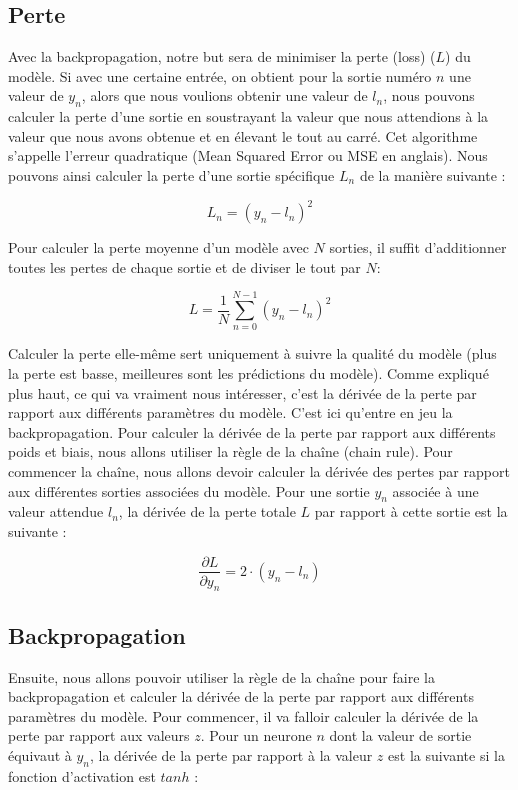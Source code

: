 \documentclass{article}
\begin{document}
\subsection{Perte}

Avec la backpropagation, notre but sera de minimiser la perte (loss) ($L$) du modèle. Si avec une certaine entrée, on obtient pour la sortie numéro $n$ une valeur de $y_n$, alors que nous voulions obtenir une valeur de $l_n$, nous pouvons calculer la perte d'une sortie en soustrayant la valeur que nous attendions à la valeur que nous avons obtenue et en élevant le tout au carré. Cet algorithme s'appelle l'erreur quadratique (Mean Squared Error ou MSE en anglais). Nous pouvons ainsi calculer la perte d'une sortie spécifique $L_n$ de la manière suivante :

\[
L_n = (y_n - l_n)^2
\]

Pour calculer la perte moyenne d'un modèle avec $N$ sorties, il suffit d'additionner toutes les pertes de chaque sortie et de diviser le tout par $N$:

\[
L = \frac{1}{N} \sum_{n=0}^{N-1} (y_n - l_n)^2
\]

\medskip

Calculer la perte elle-même sert uniquement à suivre la qualité du modèle (plus la perte est basse, meilleures sont les prédictions du modèle). Comme expliqué plus haut, ce qui va vraiment nous intéresser, c'est la dérivée de la perte par rapport aux différents paramètres du modèle. C'est ici qu'entre en jeu la backpropagation. Pour calculer la dérivée de la perte par rapport aux différents poids et biais, nous allons utiliser la règle de la chaîne (chain rule). Pour commencer la chaîne, nous allons devoir calculer la dérivée des pertes par rapport aux différentes sorties associées du modèle. Pour une sortie $y_n$ associée à une valeur attendue $l_n$, la dérivée de la perte totale $L$ par rapport à cette sortie est la suivante :

\[
\frac{\partial L}{\partial y_n} = 2 \cdot (y_n - l_n)
\]

\subsection{Backpropagation}

Ensuite, nous allons pouvoir utiliser la règle de la chaîne pour faire la backpropagation et calculer la dérivée de la perte par rapport aux différents paramètres du modèle. Pour commencer, il va falloir calculer la dérivée de la perte par rapport aux valeurs $z$. Pour un neurone $n$ dont la valeur de sortie équivaut à $y_n$, la dérivée de la perte par rapport à la valeur $z$ est la suivante si la fonction d'activation est $tanh$ :
\end{document}
